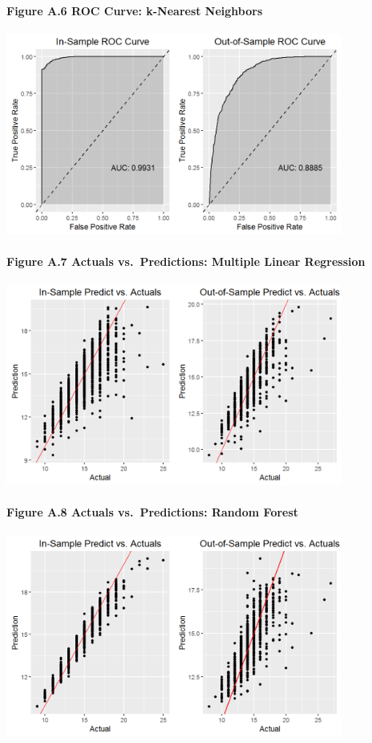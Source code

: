 \documentclass[]{article}
\let\oldparagraph\paragraph
\renewcommand{\paragraph}[1]{\oldparagraph{#1}\mbox{}}
\begin{document}
\paragraph{Figure A.6 ROC Curve: k-Nearest
Neighbors}\label{figure-a.6-roc-curve-k-nearest-neighbors}

\includegraphics[height=2.60417in]{images/resp_knn_sample_roc.png}

\newpage

\paragraph{Figure A.7 Actuals vs.~Predictions: Multiple Linear
Regression}\label{figure-a.7-actuals-vs.predictions-multiple-linear-regression}

\includegraphics[height=2.60417in]{images/amt_lm_sample_pred.png}

\paragraph{Figure A.8 Actuals vs.~Predictions: Random
Forest}\label{figure-a.8-actuals-vs.predictions-random-forest}

\includegraphics[height=2.60417in]{images/amt_rfr_sample_pred.png}
\end{document}
